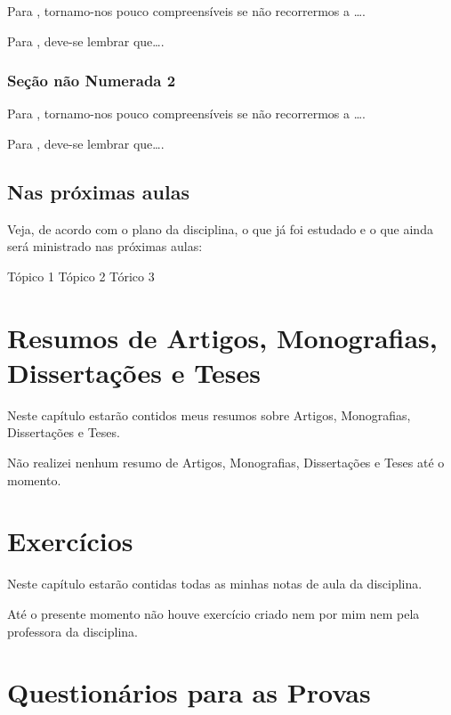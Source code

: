 \documentclass[
]{book}
\begin{document}
Para \citet{BOCK2001}, tornamo-nos pouco compreensíveis se não recorrermos a \ldots.

Para \citet{DAVIDOFF2001}, deve-se lembrar que\ldots.

\hypertarget{seuxe7uxe3o-nuxe3o-numerada-2-5}{%
\subsection*{Seção não Numerada 2}\label{seuxe7uxe3o-nuxe3o-numerada-2-5}}

Para \citet{BOCK2001}, tornamo-nos pouco compreensíveis se não recorrermos a \ldots.

Para \citet{DAVIDOFF2001}, deve-se lembrar que\ldots.

\hypertarget{nas-pruxf3ximas-aulas}{%
\section{Nas próximas aulas}\label{nas-pruxf3ximas-aulas}}

Veja, de acordo com o plano da disciplina, o que já foi estudado e o que ainda será ministrado nas próximas aulas:

Tópico 1
Tópico 2
Tórico 3

\hypertarget{resumos-de-artigos-monografias-dissertauxe7uxf5es-e-teses}{%
\chapter{Resumos de Artigos, Monografias, Dissertações e Teses}\label{resumos-de-artigos-monografias-dissertauxe7uxf5es-e-teses}}

Neste capítulo estarão contidos meus resumos sobre Artigos, Monografias, Dissertações e Teses.

Não realizei nenhum resumo de Artigos, Monografias, Dissertações e Teses até o momento.

\hypertarget{exercuxedcios}{%
\chapter{Exercícios}\label{exercuxedcios}}

Neste capítulo estarão contidas todas as minhas notas de aula da disciplina.

Até o presente momento não houve exercício criado nem por mim nem pela professora da disciplina.

\hypertarget{questionuxe1rios-para-as-provas}{%
\chapter{Questionários para as Provas}\label{questionuxe1rios-para-as-provas}}
\end{document}
